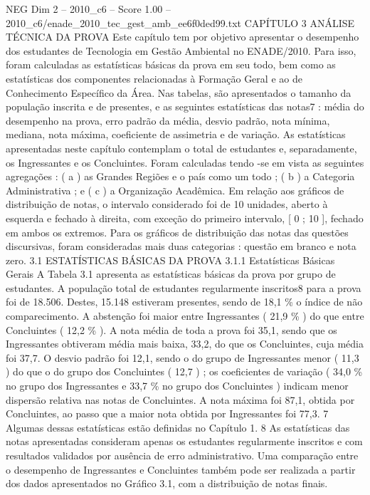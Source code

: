 \begin{textsample}{NEG Dim 2 – 2010\_c6 – Score 1.00 – 2010\_c6/enade\_2010\_tec\_gest\_amb\_ee6f0ded99.txt}  \label{ex:f2_neg_247}
CAPÍTULO 3 ANÁLISE TÉCNICA DA PROVA Este capítulo tem por objetivo apresentar o desempenho dos estudantes de Tecnologia em Gestão Ambiental no ENADE/2010.
Para isso, foram calculadas as estatísticas básicas da prova em seu todo, bem como as estatísticas dos componentes relacionadas à Formação Geral e ao de Conhecimento Específico da Área.
Nas tabelas, são apresentados o tamanho da população inscrita e de presentes, e as seguintes estatísticas das notas7 : média do desempenho na prova, erro padrão da média, desvio padrão, nota mínima, mediana, nota máxima, coeficiente de assimetria e de variação.
As estatísticas apresentadas neste capítulo contemplam o total de estudantes e, separadamente, os Ingressantes e os Concluintes.
Foram calculadas tendo -se em vista as seguintes agregações : ( a ) as Grandes Regiões e o país como um todo ; ( b ) a Categoria Administrativa ; e ( c ) a Organização Acadêmica.
Em relação aos gráficos de distribuição de notas, o intervalo considerado foi de 10 unidades, aberto à esquerda e fechado à direita, com exceção do primeiro intervalo, [ 0 ; 10 ], fechado em ambos os extremos.
Para os gráficos de distribuição das notas das questões discursivas, foram consideradas mais duas categorias : questão em branco e nota zero. 3.1 ESTATÍSTICAS BÁSICAS DA PROVA 3.1.1 Estatísticas Básicas Gerais A Tabela 3.1 apresenta as estatísticas básicas da prova por grupo de estudantes.
A população total de estudantes regularmente inscritos8 para a prova foi de 18.506.
Destes, 15.148 estiveram presentes, sendo de 18,1 \% o índice de não comparecimento.
A abstenção foi maior entre Ingressantes ( 21,9 \% ) do que entre Concluintes ( 12,2 \% ).
A nota média de toda a prova foi 35,1, sendo que os Ingressantes obtiveram média mais baixa, 33,2, do que os Concluintes, cuja média foi 37,7.
O desvio padrão foi 12,1, sendo o do grupo de Ingressantes menor ( 11,3 ) do que o do grupo dos Concluintes ( 12,7 ) ; os coeficientes de variação ( 34,0 \% no grupo dos Ingressantes e 33,7 \% no grupo dos Concluintes ) indicam menor dispersão relativa nas notas de Concluintes.
A nota máxima foi 87,1, obtida por Concluintes, ao passo que a maior nota obtida por Ingressantes foi 77,3. 7 Algumas dessas estatísticas estão definidas no Capítulo 1. 8 As estatísticas das notas apresentadas consideram apenas os estudantes regularmente inscritos e com resultados validados por ausência de erro administrativo.
Uma comparação entre o desempenho de Ingressantes e Concluintes também pode ser realizada a partir dos dados apresentados no Gráfico 3.1, com a distribuição de notas finais.

\end{textsample}
